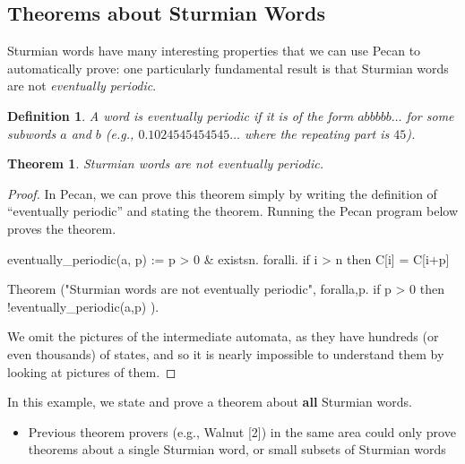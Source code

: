 \documentclass[landscape,usenames,dvipsnames]{sciposter}
\newtheorem*{thm*}{Theorem}
\newtheorem*{defin}{Definition}
\begin{document}
\begin{multicols}{3}
\columnbreak

\section*{Theorems about Sturmian Words}

Sturmian words have many interesting properties that we can use Pecan to automatically prove:
one particularly fundamental result is that Sturmian words are not \emph{eventually periodic}.
\begin{mdframed}[style=MyFrame]
\begin{defin}
    A word is \emph{eventually periodic} if it is of the form $abbbbb \ldots$ for some subwords $a$ and $b$ (e.g., $0.1024545454545\ldots$ where the repeating part is $45$).
\end{defin}


\begin{thm*}
Sturmian words are not eventually periodic.
\end{thm*}

\begin{proof}
In Pecan, we can prove this theorem simply by writing the definition of ``eventually periodic'' and stating the theorem.
Running the Pecan program below proves the theorem.
\begin{pecan}
eventually_periodic(a, p) := 
    p > 0 & existsn. foralli. if i > n then C[i] = C[i+p]
    
Theorem ("Sturmian words are not eventually periodic", { 
    foralla,p. if p > 0 then !eventually_periodic(a,p) 
}).
\end{pecan}
We omit the pictures of the intermediate automata, as they have hundreds (or even thousands) of states, and so it is nearly impossible to understand them by looking at pictures of them.
\end{proof}
\end{mdframed}


In this example, we state and prove a theorem about \textbf{all} Sturmian words.
        \begin{itemize}
            \item Previous theorem provers (e.g., Walnut [2]) in the same area could only prove theorems about a single Sturmian word, or small subsets of Sturmian words
        \end{itemize}
        

\end{multicols}
\end{document}

